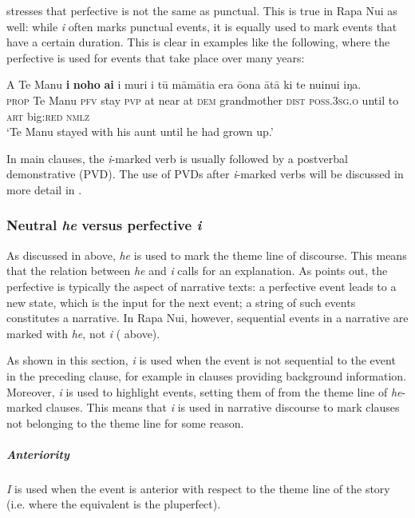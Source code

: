 \citet[17–18]{Comrie1976} stresses that perfective is not the same as punctual. This is true in Rapa Nui as well: while \textit{i} often marks punctual events, it is equally used to mark events that have a certain duration. This is clear in examples like the following, where the perfective is used for events that take place over many years:

\ea\label{ex:7.19}
\gll A Te Manu \textbf{i} \textbf{noho} \textbf{ai} {\ꞌ}i muri i tū māmātia era ō{\ꞌ}ona  {\ꞌ}ātā ki te nuinui iŋa.\\
\textsc{prop} Te Manu \textsc{pfv} stay \textsc{pvp} at near at \textsc{dem} grandmother \textsc{dist} \textsc{poss.3sg.o}  until to \textsc{art} big:\textsc{red} \textsc{nmlz}\\

\glt 
‘Te Manu stayed with his aunt until he had grown up.’ \textstyleExampleref{[R245.246]} 
\z

In main clauses, the \textit{i}{}-marked verb is usually followed by a postverbal demonstrative (PVD). The use of PVDs after \textit{i}{}-marked verbs will be discussed in more detail in . 

\subsubsection[Neutral he versus perfective i]{Neutral \textit{he} versus perfective \textit{i}}\label{sec:7.2.4.2}

As discussed in  above, \textit{he} is used to mark the theme line of discourse. This means that the relation between \textit{he} and \textit{i} calls for an explanation. As \citet[293]{Timberlake2007} points out, the perfective is typically the aspect of narrative texts: a perfective event leads to a new state, which is the input for the next event; a string of such events constitutes a narrative. In Rapa Nui, however, sequential events in a narrative are marked with \textit{he}, not \textit{i} ( above). 

As shown in this section, \textit{i} is used when the event is not sequential to the event in the preceding clause, for example in clauses providing background information. Moreover, \textit{i} is used to highlight events, setting them of from the theme line of \textit{he}{}-marked clauses. This means that \textit{i} is used in narrative discourse to mark clauses not belonging to the theme line for some reason. 

\subparagraph{Anteriority} \textit{I} is used when the event is anterior with respect to the theme line of the story (i.e. where the  equivalent is the pluperfect).

